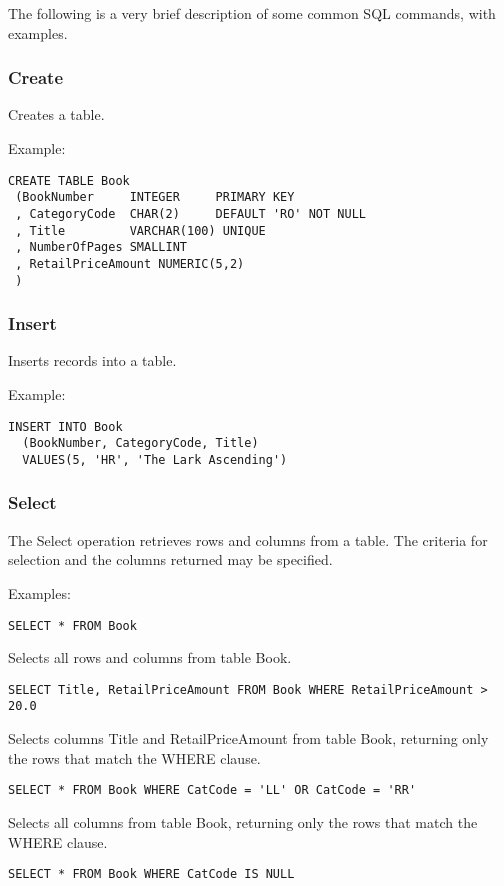 The following is a very brief description of some common SQL commands, with
examples.

\subsubsection{Create}

Creates a table.

Example:

\begin{verbatim}
CREATE TABLE Book
 (BookNumber     INTEGER     PRIMARY KEY
 , CategoryCode  CHAR(2)     DEFAULT 'RO' NOT NULL
 , Title         VARCHAR(100) UNIQUE
 , NumberOfPages SMALLINT
 , RetailPriceAmount NUMERIC(5,2)
 )
\end{verbatim}

\subsubsection{Insert}

Inserts records into a table.

Example:

\begin{verbatim}
INSERT INTO Book
  (BookNumber, CategoryCode, Title)
  VALUES(5, 'HR', 'The Lark Ascending')
\end{verbatim}

\subsubsection{Select}

The Select operation retrieves rows and columns from a table. The criteria
for selection and the columns returned may be specified.

Examples:

\verb$SELECT * FROM Book$

Selects all rows and columns from table Book.

\verb$SELECT Title, RetailPriceAmount FROM Book WHERE RetailPriceAmount > 20.0$

Selects columns Title and RetailPriceAmount from table Book, returning only
the rows that match the WHERE clause.

\verb$SELECT * FROM Book WHERE CatCode = 'LL' OR CatCode = 'RR'$

Selects all columns from table Book, returning only
the rows that match the WHERE clause.

\verb$SELECT * FROM Book WHERE CatCode IS NULL$

